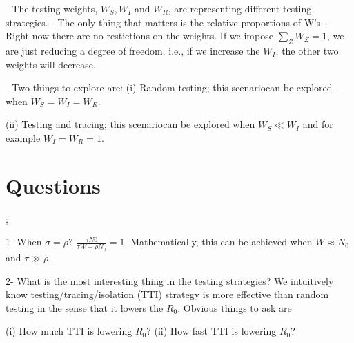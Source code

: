 - The testing weights, $W_S, W_I$ and $W_R$, are representing different testing strategies.
- The only thing that matters is the relative proportions of W's.
- Right now there are no restictions on the weights. If we impose $\sum_Z W_Z=1$, we are just reducing a degree of freedom. i.e., if we increase the $W_I$, the other two weights will decrease.

- Two things to explore are: 
(i) Random testing; this scenariocan be explored when $W_S=W_I=W_R$.

(ii) Testing and tracing; this scenariocan be explored when $W_S \ll W_I$ and for example $W_I=W_R=1$.

\section{Questions};

1- When $\sigma=\rho$?  
  $\frac{\tau N0}{\tau W+ \rho N_0} = 1$. Mathematically, this can be achieved when $W \approx N_0$ and   $\tau \gg \rho$.

2- What is the most interesting thing in the testing strategies?
We intuitively know testing/tracing/isolation (TTI) strategy is more effective than random testing in the sense that it lowers the $R_0$. Obvious things to ask are

(i)  How much TTI is lowering $R_0$? 
(ii) How fast TTI is lowering $R_0$?


